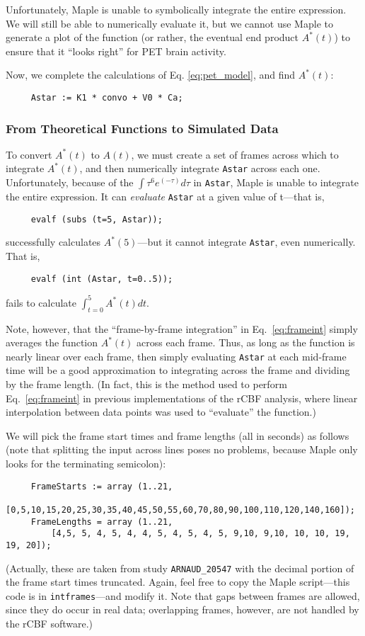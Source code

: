 Unfortunately, Maple is unable to symbolically integrate the entire
expression.  We will still be able to numerically evaluate it, but we
cannot use Maple to generate a plot of the function (or rather, the
eventual end product $A^{*}(t)$) to ensure that it ``looks right'' for PET
brain activity.

Now, we complete the calculations of Eq. \ref{eq:pet_model}, and find
$A^{*}(t)$:
\begin{verbatim}
     Astar := K1 * convo + V0 * Ca;
\end{verbatim}

\subsubsection{From Theoretical Functions to Simulated Data}

To convert $A^{*}(t)$ to $A(t)$, we must create a set of frames across
which to integrate $A^{*}(t)$, and then numerically integrate
\verb|Astar| across each one.  Unfortunately, because of the $\int
\tau^{6} e^{(-\tau)} d\tau$ in \verb|Astar|, Maple is unable to integrate
the entire expression.  It can {\em evaluate} \verb|Astar| at a given
value of t---that is, 
\begin{verbatim}
     evalf (subs (t=5, Astar));
\end{verbatim}
successfully calculates $A^{*} (5)$---but it cannot integrate
\verb|Astar|, even numerically.  That is,
\begin{verbatim}
     evalf (int (Astar, t=0..5));
\end{verbatim}
fails to calculate $\int_{t=0}^{5} A^{*} (t) dt$.

Note, however, that the ``frame-by-frame integration'' in
Eq.~\ref{eq:frameint} simply averages the function $A^{*}(t)$ across
each frame.  Thus, as long as the function is nearly linear over each
frame, then simply evaluating \verb|Astar| at each mid-frame time will
be a good approximation to integrating across the frame and dividing
by the frame length.  (In fact, this is the method used to perform
Eq.~\ref{eq:frameint} in previous implementations of the rCBF
analysis, where linear interpolation between data points was used to
``evaluate'' the function.)

We will pick the frame start times and frame lengths (all in seconds)
as follows (note that splitting the input across lines poses no
problems, because Maple only looks for the terminating semicolon):
\begin{verbatim}
     FrameStarts := array (1..21, 
         [0,5,10,15,20,25,30,35,40,45,50,55,60,70,80,90,100,110,120,140,160]);
     FrameLengths = array (1..21, 
         [4,5, 5, 4, 5, 4, 4, 5, 4, 5, 4, 5, 9,10, 9,10, 10, 10, 19, 19, 20]);
\end{verbatim}
(Actually, these are taken from study \verb|ARNAUD_20547| with the
decimal portion of the frame start times truncated.  Again, feel free
to copy the Maple script---this code is in \verb|intframes|---and
modify it.  Note that gaps between frames are allowed, since they do
occur in real data; overlapping frames, however, are not handled by
the rCBF software.)

